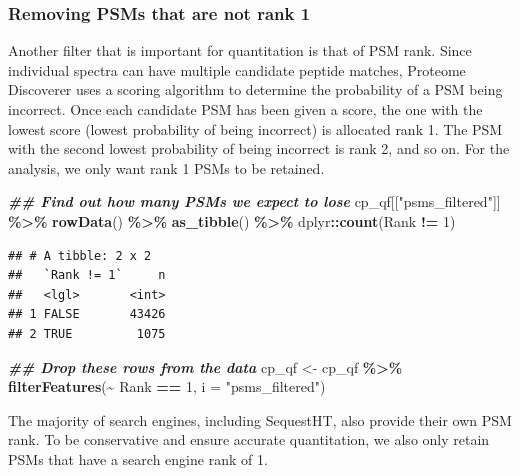 \documentclass[9pt,a4paper,]{extarticle}
\newenvironment{Shaded}{\begin{snugshade}}{\end{snugshade}}
\newcommand{\AttributeTok}[1]{\textcolor[rgb]{0.13,0.29,0.53}{#1}}
\newcommand{\DecValTok}[1]{\textcolor[rgb]{0.00,0.00,0.81}{#1}}
\newcommand{\DocumentationTok}[1]{\textcolor[rgb]{0.56,0.35,0.01}{\textbf{\textit{#1}}}}
\newcommand{\FunctionTok}[1]{\textcolor[rgb]{0.13,0.29,0.53}{\textbf{#1}}}
\newcommand{\NormalTok}[1]{#1}
\newcommand{\OtherTok}[1]{\textcolor[rgb]{0.56,0.35,0.01}{#1}}
\newcommand{\SpecialCharTok}[1]{\textcolor[rgb]{0.81,0.36,0.00}{\textbf{#1}}}
\newcommand{\StringTok}[1]{\textcolor[rgb]{0.31,0.60,0.02}{#1}}
\begin{document}
\subsubsection{Removing PSMs that are not rank 1}\label{removing-psms-that-are-not-rank-1}

Another filter that is important for quantitation is that of PSM rank. Since
individual spectra can have multiple candidate peptide matches, Proteome
Discoverer uses a scoring algorithm to determine the probability of a PSM being
incorrect. Once each candidate PSM has been given a score, the one with the
lowest score (lowest probability of being incorrect) is allocated rank 1. The PSM
with the second lowest probability of being incorrect is rank 2, and so on. For
the analysis, we only want rank 1 PSMs to be retained.

\begin{Shaded}
\begin{Highlighting}[]
\DocumentationTok{\#\# Find out how many PSMs we expect to lose}
\NormalTok{cp\_qf[[}\StringTok{"psms\_filtered"}\NormalTok{]] }\SpecialCharTok{\%\textgreater{}\%} 
  \FunctionTok{rowData}\NormalTok{() }\SpecialCharTok{\%\textgreater{}\%} 
  \FunctionTok{as\_tibble}\NormalTok{() }\SpecialCharTok{\%\textgreater{}\%} 
\NormalTok{  dplyr}\SpecialCharTok{::}\FunctionTok{count}\NormalTok{(Rank }\SpecialCharTok{!=} \DecValTok{1}\NormalTok{)}
\end{Highlighting}
\end{Shaded}

\begin{verbatim}
## # A tibble: 2 x 2
##   `Rank != 1`     n
##   <lgl>       <int>
## 1 FALSE       43426
## 2 TRUE         1075
\end{verbatim}

\begin{Shaded}
\begin{Highlighting}[]
\DocumentationTok{\#\# Drop these rows from the data}
\NormalTok{cp\_qf }\OtherTok{\textless{}{-}}\NormalTok{ cp\_qf }\SpecialCharTok{\%\textgreater{}\%}
  \FunctionTok{filterFeatures}\NormalTok{(}\SpecialCharTok{\textasciitilde{}}\NormalTok{ Rank }\SpecialCharTok{==} \DecValTok{1}\NormalTok{,}
                 \AttributeTok{i =} \StringTok{"psms\_filtered"}\NormalTok{)}
\end{Highlighting}
\end{Shaded}

The majority of search engines, including SequestHT, also provide their own PSM
rank. To be conservative and ensure accurate quantitation, we also only retain
PSMs that have a search engine rank of 1.
\end{document}
